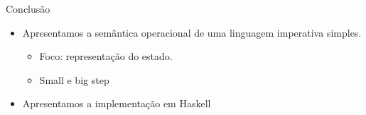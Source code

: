 \begin{frame}{Conclusão}

    \begin{itemize}

        \item
        Apresentamos a semântica operacional de uma linguagem imperativa
        simples.

        \begin{itemize}

            \item
            Foco: representação do estado.
            \item
            Small e big step
        \end{itemize}
        \item
        Apresentamos a implementação em Haskell
    \end{itemize}
\end{frame}
